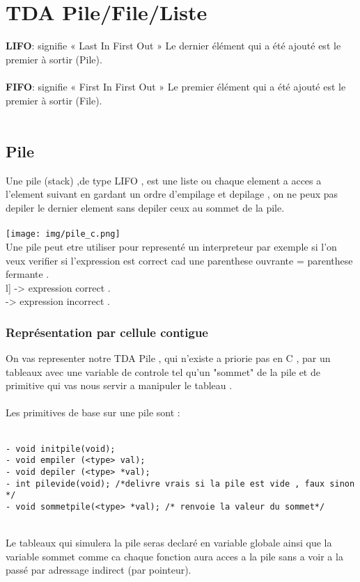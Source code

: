 \chapter{TDA Pile/File/Liste}

\textbf{LIFO}: signifie « Last In First Out » Le dernier élément qui a été ajouté est le premier à sortir (Pile).\\
 \\
\textbf{FIFO}: signifie « First In First Out » Le premier élément qui a été ajouté est le premier à sortir (File). \\
\\


\section{Pile}

Une pile (stack) ,de type LIFO , est une liste ou chaque element a acces a l'element suivant en gardant un ordre d'empilage et depilage , on ne peux pas depiler le dernier element sans depiler ceux au sommet de la pile.\\
\\
\texttt{[image: img/pile\_c.png]}
\\
Une pile peut etre utiliser pour representé un interpreteur par exemple si l'on veux verifier si l'expression est correct cad une parenthese ouvrante = parenthese fermante .\\
[a {g} h i [f] l] ->  expression correct .\\
[a {g} h i [f l] -> expression incorrect .\\



\subsection{Représentation par cellule contigue}

On vas representer notre TDA Pile , qui n'existe a priorie pas en C , par un tableaux avec une variable de controle tel qu'un "sommet" de la pile et de primitive qui vas nous servir a manipuler le tableau .\\
\\
Les primitives de base sur une pile sont : \\
\\
\begin{verbatim}
- void initpile(void);
- void empiler (<type> val); 
- void depiler (<type> *val); 
- int pilevide(void); /*delivre vrais si la pile est vide , faux sinon */
- void sommetpile(<type> *val); /* renvoie la valeur du sommet*/
\end{verbatim}
\\
Le tableaux qui simulera la pile seras declaré en variable globale ainsi que la variable sommet comme ca chaque fonction aura acces a la pile sans a voir a la passé par adressage indirect (par pointeur).\\

